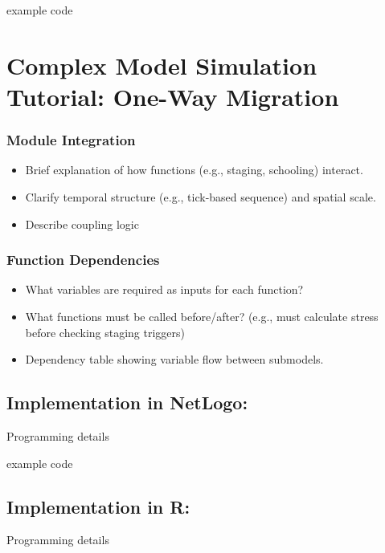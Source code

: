 \documentclass[
]{book}
\providecommand{\tightlist}{%
  \setlength{\itemsep}{0pt}\setlength{\parskip}{0pt}}
\begin{document}
example code

\chapter{Complex Model Simulation Tutorial: One-Way Migration}\label{complex-model-simulation-tutorial-one-way-migration}

\subsection{Module Integration}\label{module-integration-2}

\begin{itemize}
\tightlist
\item
  Brief explanation of how functions (e.g., staging, schooling) interact.
\item
  Clarify temporal structure (e.g., tick-based sequence) and spatial scale.
\item
  Describe coupling logic
\end{itemize}

\subsection{\texorpdfstring{\textbf{Function Dependencies}}{Function Dependencies}}\label{function-dependencies-2}

\begin{itemize}
\item
  What variables are required as inputs for each function?
\item
  What functions must be called before/after? (e.g., must calculate stress before checking staging triggers)
\item
  Dependency table showing variable flow between submodels.
\end{itemize}

\section{Implementation in NetLogo:}\label{implementation-in-netlogo-2}

Programming details

example code

\section{Implementation in R:}\label{implementation-in-r-2}

Programming details
\end{document}
